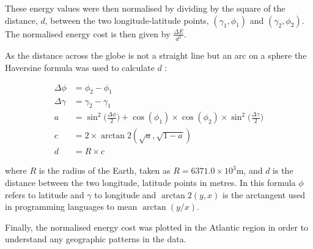 These energy values were then normalised by dividing by the square of the distance, $d$, between the two longitude-latitude points, $(\gamma_1, \phi_1)$ and $(\gamma_2, \phi_2)$. The normalised energy cost is then given by $\frac{\Delta E}{d^2}$.

As the distance across the globe is not a straight line but an arc on a sphere the Haversine formula was used to calculate $d$ \citep{Haversine1984}:

\begin{align}
    \Delta\phi &= \phi_2 - \phi_1 \\
    \Delta\gamma &= \gamma_2 - \gamma_1 \\
    a &= \sin^2\bigg(\frac{\Delta\phi}{2}\bigg) + \cos(\phi_1)\times\cos(\phi_2)\times\sin^2\bigg(\frac{\Delta\gamma}{2}\bigg) \\
    c &= 2 \times\arctan2(\sqrt{a}, \sqrt{1-a}) \\
    d &= R\times c
\end{align}

where $R$ is the radius of the Earth, taken as $R = 6371.0 \times 10^3$m, and $d$ is the distance between the two longitude, latitude points in metres. In this formula $\phi$ refers to latitude and $\gamma$ to longitude and $\arctan2(y,x)$ is the arctangent used in programming languages to mean $\arctan(y/x)$.

 Finally, the normalised energy cost was plotted in the Atlantic region in order to understand any geographic patterns in the data. 